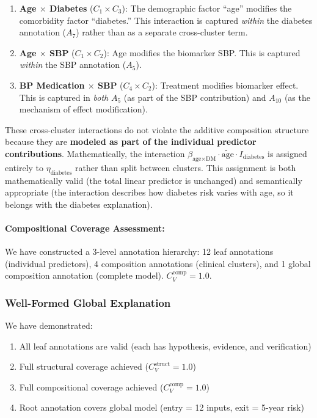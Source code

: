 \documentclass{article}
\begin{document}
\begin{enumerate}
    \item \textbf{Age $\times$ Diabetes} ($C_1 \times C_3$): The demographic factor ``age'' modifies the comorbidity factor ``diabetes.'' This interaction is captured \emph{within} the diabetes annotation ($A_7$) rather than as a separate cross-cluster term.
    \item \textbf{Age $\times$ SBP} ($C_1 \times C_2$): Age modifies the biomarker SBP. This is captured \emph{within} the SBP annotation ($A_5$).
    \item \textbf{BP Medication $\times$ SBP} ($C_4 \times C_2$): Treatment modifies biomarker effect. This is captured in \emph{both} $A_5$ (as part of the SBP contribution) and $A_{10}$ (as the mechanism of effect modification).
\end{enumerate}

These cross-cluster interactions do not violate the additive composition structure because they are \textbf{modeled as part of the individual predictor contributions}. Mathematically, the interaction $\beta_{\text{age} \times \text{DM}} \cdot \tilde{\text{age}} \cdot I_{\text{diabetes}}$ is assigned entirely to $\eta_{\text{diabetes}}$ rather than split between clusters. This assignment is both mathematically valid (the total linear predictor is unchanged) and semantically appropriate (the interaction describes how diabetes risk varies with age, so it belongs with the diabetes explanation).

\paragraph{Compositional Coverage Assessment:} We have constructed a 3-level annotation hierarchy: 12 leaf annotations (individual predictors), 4 composition annotations (clinical clusters), and 1 global composition annotation (complete model). $C_V^{\text{comp}} = 1.0$.
\subsubsection{Well-Formed Global Explanation}

We have demonstrated:
\begin{enumerate}
    \item All leaf annotations are valid (each has hypothesis, evidence, and verification)
    \item Full structural coverage achieved ($C_V^{\text{struct}} = 1.0$)
    \item Full compositional coverage achieved ($C_V^{\text{comp}} = 1.0$)
    \item Root annotation covers global model (entry = 12 inputs, exit = 5-year risk)
\end{enumerate}
\end{document}
